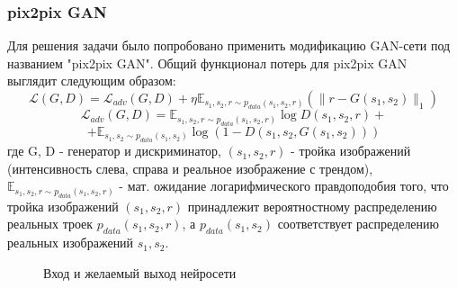 \documentclass[9pt]{beamer}
\begin{document}
\begin{frame}\frametitle{pix2pix GAN}
	Для решения задачи было попробовано применить модификацию GAN-сети под названием "pix2pix GAN". Общий функционал потерь для pix2pix GAN выглядит следующим образом: $$ \mathcal{L}(G, D) = \mathcal{L}_{adv}(G, D) + \eta \mathbb{E}_{s_1, s_2, r \sim p_{data}(s_1, s_2, r)} (\parallel r - G(s_1, s_2) \parallel_1)$$
	$$ \mathcal{L}_{adv}(G, D) = \mathbb{E}_{s_1, s_2, r \sim p_{data}(s_1, s_2, r)}\log D(s_1, s_2, r) + $$ $$ + \mathbb{E}_{s_1, s_2 \sim p_{data}(s_1, s_2)} \log (1 - D(s_1, s_2, G(s_1, s_2)))$$
	где G, D - генератор и дискриминатор, $(s_1, s_2, r)$ - тройка изображений (интенсивность слева, справа и реальное изображение с трендом),  $\mathbb{E}_{s_1, s_2, r \sim p_{data}(s_1, s_2, r)}$ - мат. ожидание логарифмического правдоподобия того, что тройка изображений $(s_1, s_2, r)$ принадлежит вероятностному распределению реальных троек $p_{data}(s_1, s_2, r)$, а $p_{data}(s_1, s_2)$ соответствует распределению реальных изображений $s_1, s_2$. \\
	\begin{figure}
		\caption{Вход и желаемый выход нейросети}
	\end{figure}
\end{frame}
\end{document}
